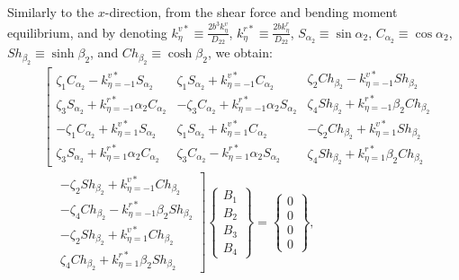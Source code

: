 \documentclass[preprint,12pt,number]{elsarticle}
\begin{document}
Similarly to the $x$-direction, from the shear force and bending moment equilibrium, and by denoting 
$k^{v*}_{\eta} \equiv \frac{2b^3 k^v_{\eta}}{D_{22}} $, 
$k^{r*}_{\eta} \equiv \frac{2b k^r_{\eta}}{D_{22}} $, 
$S_{\alpha_2}\equiv\sin\alpha_2  $, 
$C_{\alpha_2}\equiv\cos\alpha_2  $, 
$Sh_{\beta_2}\equiv\sinh\beta_2$, and 
$Ch_{\beta_2}\equiv \cosh\beta_2$, 
we obtain:
%
\begin{equation}\label{eq:ABy}
\begin{split}
	&\left[ \begin{array}{c}
		\zeta_1C_{\alpha_2}-k^{v*}_{\eta=-1}S_{\alpha_2} \\ \zeta_3S_{\alpha_2}+k^{r*}_{\eta=-1}\alpha_2C_{\alpha_2} \\ -\zeta_1C_{\alpha_2}+k^{v*}_{\eta=1}S_{\alpha_2} \\ \zeta_3S_{\alpha_2}+k^{r*}_{\eta=1}\alpha_2C_{\alpha_2}
	\end{array} \begin{array}{c}
		\zeta_1S_{\alpha_2}+k^{v*}_{\eta=-1}C_{\alpha_2} \\ -\zeta_3C_{\alpha_2}+k^{r*}_{\eta=-1}\alpha_2S_{\alpha_2} \\ \zeta_1S_{\alpha_2}+k^{v*}_{\eta=1}C_{\alpha_2} \\ \zeta_3C_{\alpha_2}-k^{r*}_{\eta=1}\alpha_2S_{\alpha_2}
	\end{array} \begin{array}{c}
		\zeta_2Ch_{\beta_2}-k^{v*}_{\eta=-1}Sh_{\beta_2} \\ \zeta_4Sh_{\beta_2}+k^{r*}_{\eta=-1}\beta_2Ch_{\beta_2} \\ -\zeta_2Ch_{\beta_2}+k^{v*}_{\eta=1}Sh_{\beta_2} \\ \zeta_4Sh_{\beta_2}+k^{r*}_{\eta=1}\beta_2Ch_{\beta_2}
	\end{array} \right. \\
	&\quad
	\left. \begin{array}{c}
		-\zeta_2Sh_{\beta_2}+k^{v*}_{\eta=-1}Ch_{\beta_2} \\ -\zeta_4Ch_{\beta_2}-k^{r*}_{\eta=-1}\beta_2Sh_{\beta_2} \\ -\zeta_2Sh_{\beta_2}+k^{v*}_{\eta=1}Ch_{\beta_2} \\ \zeta_4Ch_{\beta_2}+k^{r*}_{\eta=1}\beta_2Sh_{\beta_2}
	\end{array} \right]\begin{Bmatrix}
		B_1\\B_2\\B_3\\B_4
	\end{Bmatrix}=\begin{Bmatrix}
		0\\0\\0\\0
	\end{Bmatrix},
\end{split}
\end{equation}
\end{document}
